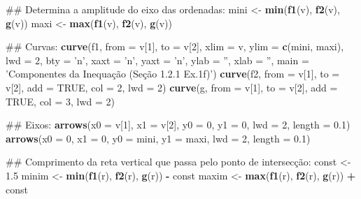\documentclass[]{book}
\newenvironment{Shaded}{\begin{snugshade}}{\end{snugshade}}
\newcommand{\KeywordTok}[1]{\textcolor[rgb]{0.13,0.29,0.53}{\textbf{#1}}}
\newcommand{\DataTypeTok}[1]{\textcolor[rgb]{0.13,0.29,0.53}{#1}}
\newcommand{\DecValTok}[1]{\textcolor[rgb]{0.00,0.00,0.81}{#1}}
\newcommand{\FloatTok}[1]{\textcolor[rgb]{0.00,0.00,0.81}{#1}}
\newcommand{\StringTok}[1]{\textcolor[rgb]{0.31,0.60,0.02}{#1}}
\newcommand{\OtherTok}[1]{\textcolor[rgb]{0.56,0.35,0.01}{#1}}
\newcommand{\OperatorTok}[1]{\textcolor[rgb]{0.81,0.36,0.00}{\textbf{#1}}}
\newcommand{\NormalTok}[1]{#1}
\begin{document}
\begin{enumerate}
\begin{Shaded}
\begin{Highlighting}[]
\NormalTok{##  Determina  a amplitude do eixo das ordenadas:}
\NormalTok{mini <-}\StringTok{ }\KeywordTok{min}\NormalTok{(}\KeywordTok{f1}\NormalTok{(v), }\KeywordTok{f2}\NormalTok{(v), }\KeywordTok{g}\NormalTok{(v))}
\NormalTok{maxi <-}\StringTok{ }\KeywordTok{max}\NormalTok{(}\KeywordTok{f1}\NormalTok{(v), }\KeywordTok{f2}\NormalTok{(v), }\KeywordTok{g}\NormalTok{(v))}

\NormalTok{##  Curvas:}
\KeywordTok{curve}\NormalTok{(f1, }\DataTypeTok{from =}\NormalTok{ v[}\DecValTok{1}\NormalTok{], }\DataTypeTok{to =}\NormalTok{ v[}\DecValTok{2}\NormalTok{], }\DataTypeTok{xlim =}\NormalTok{ v, }\DataTypeTok{ylim =} \KeywordTok{c}\NormalTok{(mini, maxi), }\DataTypeTok{lwd =} \DecValTok{2}\NormalTok{,}
  \DataTypeTok{bty =} \StringTok{'n'}\NormalTok{, }\DataTypeTok{xaxt =} \StringTok{'n'}\NormalTok{, }\DataTypeTok{yaxt =} \StringTok{'n'}\NormalTok{, }\DataTypeTok{ylab =} \StringTok{''}\NormalTok{, }\DataTypeTok{xlab =} \StringTok{''}\NormalTok{,}
  \DataTypeTok{main =} \StringTok{'Componentes da Inequação (Seção 1.2.1 Ex.1f)'}\NormalTok{)}
\KeywordTok{curve}\NormalTok{(f2, }\DataTypeTok{from =}\NormalTok{ v[}\DecValTok{1}\NormalTok{], }\DataTypeTok{to =}\NormalTok{ v[}\DecValTok{2}\NormalTok{], }\DataTypeTok{add =} \OtherTok{TRUE}\NormalTok{, }\DataTypeTok{col =} \DecValTok{2}\NormalTok{, }\DataTypeTok{lwd =} \DecValTok{2}\NormalTok{)}
\KeywordTok{curve}\NormalTok{(g, }\DataTypeTok{from =}\NormalTok{ v[}\DecValTok{1}\NormalTok{], }\DataTypeTok{to =}\NormalTok{ v[}\DecValTok{2}\NormalTok{], }\DataTypeTok{add =} \OtherTok{TRUE}\NormalTok{, }\DataTypeTok{col =} \DecValTok{3}\NormalTok{, }\DataTypeTok{lwd =} \DecValTok{2}\NormalTok{)}

\NormalTok{##  Eixos:}
\KeywordTok{arrows}\NormalTok{(}\DataTypeTok{x0 =}\NormalTok{ v[}\DecValTok{1}\NormalTok{], }\DataTypeTok{x1 =}\NormalTok{ v[}\DecValTok{2}\NormalTok{],}
   \DataTypeTok{y0 =} \DecValTok{0}\NormalTok{, }\DataTypeTok{y1 =} \DecValTok{0}\NormalTok{, }\DataTypeTok{lwd =} \DecValTok{2}\NormalTok{, }\DataTypeTok{length =} \FloatTok{0.1}\NormalTok{)}
\KeywordTok{arrows}\NormalTok{(}\DataTypeTok{x0 =} \DecValTok{0}\NormalTok{, }\DataTypeTok{x1 =} \DecValTok{0}\NormalTok{,}
   \DataTypeTok{y0 =}\NormalTok{ mini, }\DataTypeTok{y1 =}\NormalTok{ maxi, }\DataTypeTok{lwd =} \DecValTok{2}\NormalTok{, }\DataTypeTok{length =} \FloatTok{0.1}\NormalTok{)}

\NormalTok{##  Comprimento da reta vertical que passa pelo ponto de intersecção:}
\NormalTok{const <-}\StringTok{ }\FloatTok{1.5}
\NormalTok{minim <-}\StringTok{ }\KeywordTok{min}\NormalTok{(}\KeywordTok{f1}\NormalTok{(r), }\KeywordTok{f2}\NormalTok{(r), }\KeywordTok{g}\NormalTok{(r)) }\OperatorTok{-}\StringTok{ }\NormalTok{const}
\NormalTok{maxim <-}\StringTok{ }\KeywordTok{max}\NormalTok{(}\KeywordTok{f1}\NormalTok{(r), }\KeywordTok{f2}\NormalTok{(r), }\KeywordTok{g}\NormalTok{(r)) }\OperatorTok{+}\StringTok{ }\NormalTok{const}


\end{Highlighting}
\end{Shaded}
\end{enumerate}
\end{document}
